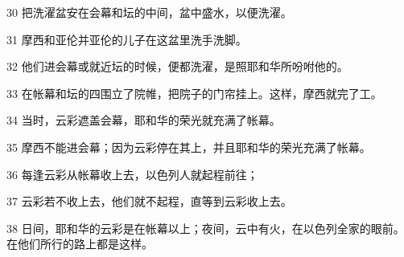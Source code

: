 \par 30 把洗濯盆安在会幕和坛的中间，盆中盛水，以便洗濯。
\par 31 摩西和亚伦并亚伦的儿子在这盆里洗手洗脚。
\par 32 他们进会幕或就近坛的时候，便都洗濯，是照耶和华所吩咐他的。
\par 33 在帐幕和坛的四围立了院帷，把院子的门帘挂上。这样，摩西就完了工。
\par 34 当时，云彩遮盖会幕，耶和华的荣光就充满了帐幕。
\par 35 摩西不能进会幕；因为云彩停在其上，并且耶和华的荣光充满了帐幕。
\par 36 每逢云彩从帐幕收上去，以色列人就起程前往；
\par 37 云彩若不收上去，他们就不起程，直等到云彩收上去。
\par 38 日间，耶和华的云彩是在帐幕以上；夜间，云中有火，在以色列全家的眼前。在他们所行的路上都是这样。



